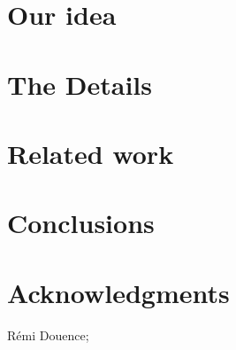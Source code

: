 \documentclass{acm_proc_article-sp}
\begin{document}
\section{Our idea}

\section{The Details}

\section{Related work}

\section{Conclusions}

\section{Acknowledgments}

Rémi Douence;





\end{document}
